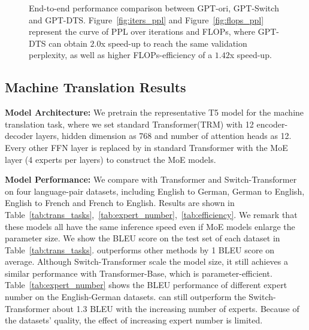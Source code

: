 \begin{figure*}[t]
    \begin{center}
    \caption{End-to-end performance comparison between GPT-ori, GPT-Switch and GPT-DTS. Figure~\ref{fig:iters_ppl} and Figure~\ref{fig:flops_ppl} represent the curve of PPL over iterations and FLOPs, where GPT-DTS can obtain $2.0$x speed-up to reach the same validation perplexity, as well as higher FLOPs-efficiency of a $1.42$x speed-up.
}
    \label{fig:end2end}
    \end{center}
\end{figure*}

\subsection{Machine Translation Results}

\textbf{Model Architecture:} We pretrain the representative T5 model for the machine translation task, where we set standard Transformer(TRM) with 12 encoder-decoder layers, hidden dimension as 768 and number of attention heads as 12. 
Every other FFN layer is replaced by in standard Transformer with the MoE layer (4 experts per layers) to construct the MoE models. 

\textbf{Model Performance:}
We compare \evomoe{} with Transformer and Switch-Transformer on four language-pair datasets, including English to German, German to English, English to French and French to English. Results are shown in Table~\ref{tab:trans_tasks},~\ref{tab:expert_number},~\ref{tab:efficiency}.
We remark that these models all have the same inference speed even if MoE models enlarge the parameter size.
We show the BLEU score on the test set of each dataset in Table~\ref{tab:trans_tasks}.
\ourmethods{} outperforms other methods by 1 BLEU score on average.
Although Switch-Transformer scale the model size, it still achieves a similar performance with Transformer-Base, which is parameter-efficient.
Table~\ref{tab:expert_number} shows the BLEU performance of different expert number on the English-German datasets. \ourmethods{} can still outperform the Switch-Transformer about 1.3 BLEU with the increasing number of experts. Because of the datasets' quality, the effect of increasing expert number is limited.

